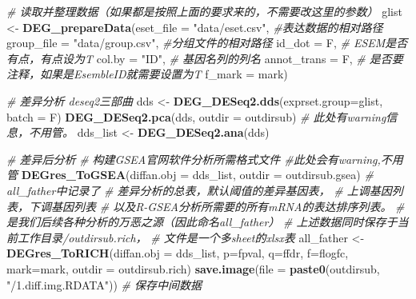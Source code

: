 \documentclass[
]{book}
\newenvironment{Shaded}{\begin{snugshade}}{\end{snugshade}}
\newcommand{\AttributeTok}[1]{\textcolor[rgb]{0.13,0.29,0.53}{#1}}
\newcommand{\CommentTok}[1]{\textcolor[rgb]{0.56,0.35,0.01}{\textit{#1}}}
\newcommand{\FunctionTok}[1]{\textcolor[rgb]{0.13,0.29,0.53}{\textbf{#1}}}
\newcommand{\NormalTok}[1]{#1}
\newcommand{\OtherTok}[1]{\textcolor[rgb]{0.56,0.35,0.01}{#1}}
\newcommand{\StringTok}[1]{\textcolor[rgb]{0.31,0.60,0.02}{#1}}
\begin{document}
\begin{Shaded}
\begin{Highlighting}[]
\CommentTok{\# 读取并整理数据（如果都是按照上面的要求来的，不需要改这里的参数）}
\NormalTok{glist }\OtherTok{\textless{}{-}} \FunctionTok{DEG\_prepareData}\NormalTok{(}\AttributeTok{eset\_file =} \StringTok{"data/eset.csv"}\NormalTok{, }\CommentTok{\#表达数据的相对路径}
                         \AttributeTok{group\_file =} \StringTok{"data/group.csv"}\NormalTok{, }\CommentTok{\#分组文件的相对路径}
                         \AttributeTok{id\_dot =}\NormalTok{ F,  }\CommentTok{\# ESEM是否有点，有点设为T}
                         \AttributeTok{col.by =} \StringTok{"ID"}\NormalTok{,  }\CommentTok{\# 基因名列的列名}
                         \AttributeTok{annot\_trans =}\NormalTok{ F, }\CommentTok{\# 是否要注释，如果是EsembleID就需要设置为T}
                         \AttributeTok{f\_mark =}\NormalTok{ mark)}

\CommentTok{\# 差异分析 deseq2三部曲}
\NormalTok{dds }\OtherTok{\textless{}{-}} \FunctionTok{DEG\_DESeq2.dds}\NormalTok{(}\AttributeTok{exprset.group=}\NormalTok{glist, }\AttributeTok{batch =}\NormalTok{ F)}
\FunctionTok{DEG\_DESeq2.pca}\NormalTok{(dds, }\AttributeTok{outdir =}\NormalTok{ outdirsub) }\CommentTok{\# 此处有warning信息，不用管。}
\NormalTok{dds\_list }\OtherTok{\textless{}{-}} \FunctionTok{DEG\_DESeq2.ana}\NormalTok{(dds)}

\CommentTok{\# 差异后分析}
\CommentTok{\# 构建GSEA官网软件分析所需格式文件 \#此处会有warning,不用管}
\FunctionTok{DEGres\_ToGSEA}\NormalTok{(}\AttributeTok{diffan.obj =}\NormalTok{ dds\_list, }\AttributeTok{outdir =}\NormalTok{ outdirsub.gsea) }
\CommentTok{\# all\_father中记录了}
\CommentTok{\#             差异分析的总表，默认阈值的差异基因表，}
\CommentTok{\#             上调基因列表，下调基因列表}
\CommentTok{\#             以及R{-}GSEA分析所需要的所有mRNA的表达排序列表。}
\CommentTok{\#  是我们后续各种分析的万恶之源（因此命名all\_father）}
\CommentTok{\#  上述数据同时保存于当前工作目录/outdirsub.rich，}
\CommentTok{\#  文件是一个多sheet的xlsx表}
\NormalTok{all\_father }\OtherTok{\textless{}{-}} \FunctionTok{DEGres\_ToRICH}\NormalTok{(}\AttributeTok{diffan.obj =}\NormalTok{ dds\_list, }\AttributeTok{p=}\NormalTok{fpval, }\AttributeTok{q=}\NormalTok{ffdr, }
                            \AttributeTok{f=}\NormalTok{flogfc, }\AttributeTok{mark=}\NormalTok{mark, }\AttributeTok{outdir =}\NormalTok{ outdirsub.rich)}
\FunctionTok{save.image}\NormalTok{(}\AttributeTok{file =} \FunctionTok{paste0}\NormalTok{(outdirsub, }\StringTok{"/1.diff.img.RDATA"}\NormalTok{)) }\CommentTok{\# 保存中间数据}
\end{Highlighting}
\end{Shaded}
\end{document}
